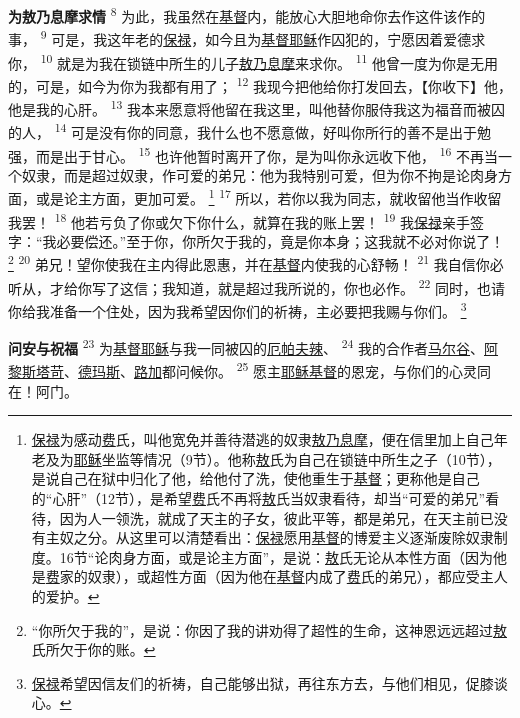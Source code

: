 \textbf{为敖乃息摩求情\quad}
\textsuperscript{8}
为此，我虽然在\uline{基督}内，能放心大胆地命你去作这件该作的事，
\textsuperscript{9}
可是，我这年老的\uline{保禄}，如今且为\uline{基督}\uline{耶稣}作囚犯的，宁愿因着爱德求你，
\textsuperscript{10}
就是为我在锁链中所生的儿子\uline{敖乃息摩}来求你。
\textsuperscript{11}
他曾一度为你是无用的，可是，如今为你为我都有用了；
\textsuperscript{12}
我现今把他给你打发回去，【你收下】他，他是我的心肝。
\textsuperscript{13}
我本来愿意将他留在我这里，叫他替你服侍我这为福音而被囚的人，
\textsuperscript{14}
可是没有你的同意，我什么也不愿意做，好叫你所行的善不是出于勉强，而是出于甘心。
\textsuperscript{15}
也许他暂时离开了你，是为叫你永远收下他，
\textsuperscript{16}
不再当一个奴隶，而是超过奴隶，作可爱的弟兄：他为我特别可爱，但为你不拘是论肉身方面，或是论主方面，更加可爱。
\footnote{\uline{保禄}为感动\uline{费}氏，叫他宽免并善待潜逃的奴隶\uline{敖乃息摩}，便在信里加上自己年老及为\uline{耶稣}坐监等情况（9节）。他称\uline{敖}氏为自己在锁链中所生之子（10节），是说自己在狱中归化了他，给他付了洗，使他重生于\uline{基督}；更称他是自己的“心肝”（12节），是希望\uline{费}氏不再将\uline{敖}氏当奴隶看待，却当“可爱的弟兄”看待，因为人一领洗，就成了天主的子女，彼此平等，都是弟兄，在天主前已没有主奴之分。从这里可以清楚看出：\uline{保禄}愿用\uline{基督}的博爱主义逐渐废除奴隶制度。16节“论肉身方面，或是论主方面”，是说：\uline{敖}氏无论从本性方面（因为他是\uline{费}家的奴隶），或超性方面（因为他在\uline{基督}内成了\uline{费}氏的弟兄），都应受主人的爱护。}
\textsuperscript{17}
所以，若你以我为同志，就收留他当作收留我罢！
\textsuperscript{18}
他若亏负了你或欠下你什么，就算在我的账上罢！
\textsuperscript{19}
我\uline{保禄}亲手签字：“我必要偿还。”至于你，你所欠于我的，竟是你本身；这我就不必对你说了！
\footnote{“你所欠于我的”，是说：你因了我的讲劝得了超性的生命，这神恩远远超过\uline{敖}氏所欠于你的账。}
\textsuperscript{20}
弟兄！望你使我在主内得此恩惠，并在\uline{基督}内使我的心舒畅！
\textsuperscript{21}
我自信你必听从，才给你写了这信；我知道，就是超过我所说的，你也必作。
\textsuperscript{22}
同时，也请你给我准备一个住处，因为我希望因你们的祈祷，主必要把我赐与你们。
\footnote{\uline{保禄}希望因信友们的祈祷，自己能够出狱，再往东方去，与他们相见，促膝谈心。}

\textbf{问安与祝福\quad}
\textsuperscript{23}
为\uline{基督}\uline{耶稣}与我一同被囚的\uline{厄帕夫辣}、
\textsuperscript{24}
我的合作者\uline{马尔谷}、\uline{阿黎斯塔苛}、\uline{德玛斯}、\uline{路加}都问候你。
\textsuperscript{25}
愿主\uline{耶稣}\uline{基督}的恩宠，与你们的心灵同在！阿门。
